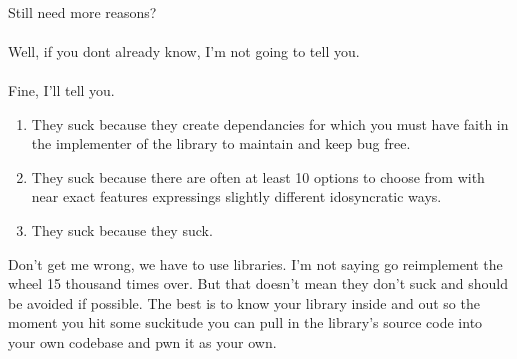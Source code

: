 \documentclass{book}
\begin{document}
\paragraph{}
Still need more reasons?
\paragraph{}
Well, if you dont already know, I'm not going to tell you.
\paragraph{}
Fine, I'll tell you.
\begin{enumerate}
    \item They suck because they create dependancies for which you must have faith in the implementer of the library to maintain and keep bug free.
    \item They suck because there are often at least 10 options to choose from with near exact features expressings slightly different idosyncratic ways.
    \item They suck because they suck.
\end{enumerate}
Don't get me wrong, we have to use libraries. I'm not saying go reimplement the wheel 15 thousand times over. But that doesn't mean they don't suck and should be avoided if possible. The best is to know your library inside and out so the moment you hit some suckitude you can pull in the library's source code into your own codebase and \gls{pwn} it as your own.





\end{document}
